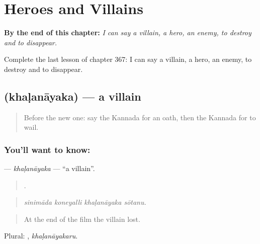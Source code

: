 
\chapter{Heroes and Villains}
\label{ch:ka-heroes-and-villains}

\begin{chapteropening}
\textbf{By the end of this chapter:} \emph{I can say a villain, a hero, an enemy, to destroy and to disappear.}

Complete the last lesson of chapter 367: I can say a villain, a hero, an enemy, to destroy and to disappear.
\end{chapteropening}

\section[\texorpdfstring{\kn{ಖಳನಾಯಕ} (khaḷanāyaka)}{ಖಳನಾಯಕ (khaḷanāyaka)}]{ (khaḷanāyaka) — a villain}

\label{lesson:KA-C367-khalanayaka}



\begin{quote}
Before the new one: say the Kannada for an oath, then the Kannada for to wail.
\end{quote}

\subsection*{You'll want to know: }
\textbf{} — \emph{khaḷanāyaka} — \textquotedblleft{}a villain\textquotedblright{}.

\begin{quote}
   .
\end{quote}

\begin{quote}
\emph{sinimāda koneyalli khaḷanāyaka sōtanu.}
\end{quote}

\begin{quote}
At the end of the film the villain lost.
\end{quote}

Plural: , \emph{khaḷanāyakaru}.

